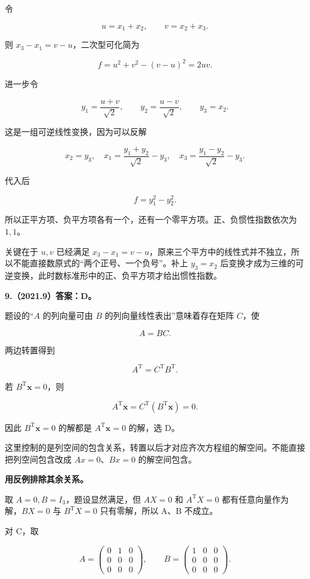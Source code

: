 \documentclass[UTF8,11pt,fontset=windows]{ctexart}
\begin{document}
令

$$
u=x_1+x_2,\qquad v=x_2+x_3.
$$

则 $x_3-x_1=v-u$，二次型可化简为

$$
f=u^2+v^2-(v-u)^2=2uv.
$$

进一步令

$$
y_1=\frac{u+v}{\sqrt2},\qquad
y_2=\frac{u-v}{\sqrt2},\qquad y_3=x_2.
$$

这是一组可逆线性变换，因为可以反解

$$
x_2=y_3,\quad
x_1=\frac{y_1+y_2}{\sqrt2}-y_3,\quad
x_3=\frac{y_1-y_2}{\sqrt2}-y_3.
$$

代入后

$$
f=y_1^2-y_2^2.
$$

所以正平方项、负平方项各有一个，还有一个零平方项。正、负惯性指数依次为 $1,1$。

关键在于 $u,v$ 已经满足 $x_3-x_1=v-u$，原来三个平方中的线性式并不独立，所以不能直接数原式的“两个正号、一个负号”。补上 $y_3=x_2$ 后变换才成为三维的可逆变换，此时数标准形中的正、负平方项才给出惯性指数。

\clearpage

\textbf{9.（2021.9）答案：D。}

题设的“$A$ 的列向量可由 $B$ 的列向量线性表出”意味着存在矩阵 $C$，使

$$
A=BC.
$$

两边转置得到

$$
A^{\mathrm T}=C^{\mathrm T}B^{\mathrm T}.
$$

若 $B^{\mathrm T}\boldsymbol x=0$，则

$$
A^{\mathrm T}\boldsymbol x
=C^{\mathrm T}(B^{\mathrm T}\boldsymbol x)=0.
$$

因此 $B^{\mathrm T}\boldsymbol x=0$ 的解都是 $A^{\mathrm T}\boldsymbol x=0$ 的解，选 D。

这里控制的是列空间的包含关系，转置以后才对应齐次方程组的解空间。不能直接把列空间包含改成 $Ax=0$、$Bx=0$ 的解空间包含。

\textbf{用反例排除其余关系。}

取 $A=0,B=I_3$，题设显然满足，但 $AX=0$ 和 $A^{\mathrm T}X=0$ 都有任意向量作为解，$BX=0$ 与 $B^{\mathrm T}X=0$ 只有零解，所以 A、B 不成立。

对 C，取

$$
A=\begin{pmatrix}0&1&0\\0&0&0\\0&0&0\end{pmatrix},
\qquad B=\begin{pmatrix}1&0&0\\0&0&0\\0&0&0\end{pmatrix}.
$$
\end{document}
